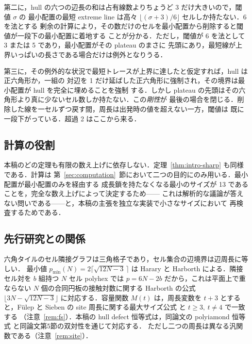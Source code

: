 \documentclass[11pt]{article}
\theoremstyle{plain}
\theoremstyle{definition}
\theoremstyle{remark}
\begin{document}
第二に，hull の六つの辺長の和は占有線数よりちょうど 3 だけ大きいので，閾値 \(\sigma\) の
最小配置の最短 extreme line は高々 \(\lfloor(\sigma+3)/6\rfloor\) セルしか持たない．6 を法とする
剰余の計算により，その数だけのセルを最小配置から削除すると閾値が一段下の最小配置に着地する
ことが分かる．ただし，閾値が 6 を法として 3 または 5 であり，最小配置がその plateau のまさに
先頭にあり，最短線が上界いっぱいの長さである場合だけは例外となりうる．

第三に，その例外的な状況で最短トレースが上界に達したと仮定すれば，hull は正六角形か，一組の
対辺を 1 だけ延ばした正六角形に強制され，その境界は最小配置が hull を完全に埋めることを強制
する．しかし plateau の先頭はその六角形より真に少ないセル数しか持たない．この\emph{剛性}が
最後の場合を閉じる．削除した線を一セルずつ戻す間，周長は出発時の値を超えない一方，閾値は
既に一段下がっている．超過 2 はここから来る．

\subsection{計算の役割}\label{sec:0.4}

本稿のどの定理も有限の数え上げに依存しない．定理~\ref{thm:intro-sharp} も同様である．計算は
第~\ref{sec:computation}~節において二つの目的にのみ用いる．最小配置が最小配置のみを経由する
成長鎖を持たなくなる最小のサイズが 13 であることを，完全な数え上げによって決定するため——
これは解析的な議論が答えない問いである——と，本稿の主張を独立な実装で小さなサイズにおいて
再検査するためである．

\subsection{先行研究との関係}\label{sec:0.5}

六角タイルのセル隣接グラフは三角格子であり，セル集合の辺境界は辺周長に等しい．
最小値 \(p_{\min}(N)=2\lceil\sqrt{12N-3}\,\rceil\) は Harary と Harborth
\cite{HararyHarborth1976} による．隣接セル対を \(b\) 組持つ \(N\) セル polyhex では
\(p=6N-2b\) だから，これは平面上で重ならない \(N\) 個の合同円板の接触対数に関する
Harborth の公式 \(\lfloor3N-\sqrt{12N-3}\rfloor\)
\cite{Harborth1974} に対応する．容量関数 \(M(t)\) は，周長変数を \(t+3\)
とすると，Fülep と Sieben の site 周長に関する最大サイズ公式
\cite[Proposition~5.10]{FulepSieben2010} と \(t\ge3,\ t\ne4\) で一致する
（注意~\ref{rem:fs}）．本稿の hull defect 恒等式は，同論文の polyiamond 恒等式
\cite[Lemma~3.3]{FulepSieben2010} と同論文第5節の双対性を通じて対応する．
ただし二つの周長は異なる汎関数である（注意~\ref{rem:site}）．
\end{document}
